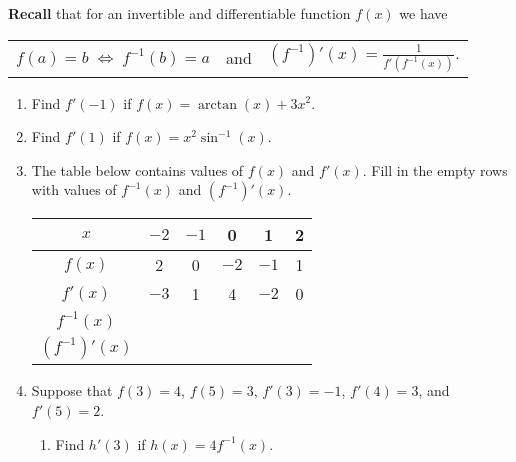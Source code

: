 \documentclass[11pt]{article}
\begin{document}
\drawtitle

\noindent \textbf{Recall} that for an invertible and differentiable
function $f(x)$ we have

\begin{center}
  \begin{tabular}{ccc}
    $f(a) = b \; \Leftrightarrow \; f^{-1}(b) =
    a$ & and & $\displaystyle (f^{-1})'(x) = \frac{1}{f'(f^{-1}(x))}.$
  \end{tabular}
\end{center}

\vspace{.25in}

\begin{enumerate}
\item Find $f'(-1)$ if $f(x) = \arctan(x) + 3x^2$.
  
  \vfill
  
\item Find $f'(1)$ if $f(x) = x^2\sin^{-1}(x)$.
  
  \vfill
  
  \newpage

\item The table below contains values of $f(x)$ and $f'(x)$. Fill in
  the empty rows with values of $f^{-1}(x)$ and $(f^{-1})'(x)$.
  
  \begin{center}
    {
      \renewcommand{\arraystretch}{2}
    \begin{tabular}{ c | c c c c c}
      $x$ &	$-2$ & $-1$ & 0 & 1 & 2 \\ \hline\hline
      $f(x)$	& 2 & 0 & $-2$ & $-1$ & 1  \\ 
      $f'(x)$	& $-3$ & 1 & 4 & $-2$ & 0   \\
      $f^{-1}(x)$	&  &  &  &  &   \\
      $(f^{-1})'(x)$	&  & & & &   \\
    \end{tabular}
    }
    
  \end{center}
  
  \vfill
  
\item Suppose that $f(3)=4$, $f(5)=3$, $f'(3)=-1$, $f'(4)=3$, and $f'(5) = 2$.
  
  \begin{enumerate}
    
  \item Find $h'(3)$ if $h(x) = 4f^{-1}(x)$.
    \vfill\vfill
    

\end{enumerate}
\end{enumerate}
\end{document}
